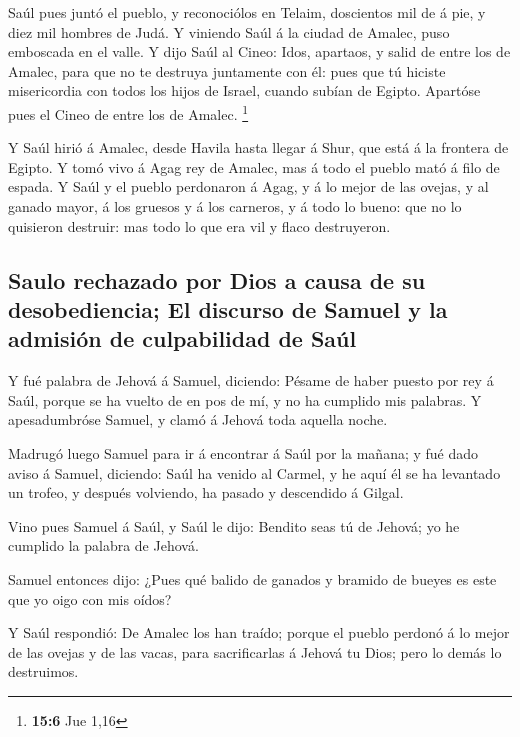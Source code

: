  Saúl pues juntó el pueblo, y reconociólos en Telaim,
doscientos mil de á pie, y diez mil hombres de Judá.  Y
viniendo Saúl á la ciudad de Amalec, puso emboscada en el valle.
 Y dijo Saúl al Cineo: Idos, apartaos, y salid de entre
los de Amalec, para que no te destruya juntamente con él: pues que tú
hiciste misericordia con todos los hijos de Israel, cuando subían de
Egipto. Apartóse pues el Cineo de entre los de Amalec. \footnote{\textbf{15:6}
  Jue 1,16}

 Y Saúl hirió á Amalec, desde Havila hasta llegar á Shur,
que está á la frontera de Egipto.  Y tomó vivo á Agag rey
de Amalec, mas á todo el pueblo mató á filo de espada.  Y
Saúl y el pueblo perdonaron á Agag, y á lo mejor de las ovejas, y al
ganado mayor, á los gruesos y á los carneros, y á todo lo bueno: que no
lo quisieron destruir: mas todo lo que era vil y flaco destruyeron.

\hypertarget{saulo-rechazado-por-dios-a-causa-de-su-desobediencia-el-discurso-de-samuel-y-la-admisiuxf3n-de-culpabilidad-de-sauxfal}{%
\subsection{Saulo rechazado por Dios a causa de su desobediencia; El
discurso de Samuel y la admisión de culpabilidad de
Saúl}\label{saulo-rechazado-por-dios-a-causa-de-su-desobediencia-el-discurso-de-samuel-y-la-admisiuxf3n-de-culpabilidad-de-sauxfal}}

 Y fué palabra de Jehová á Samuel, diciendo:
 Pésame de haber puesto por rey á Saúl, porque se ha
vuelto de en pos de mí, y no ha cumplido mis palabras. Y apesadumbróse
Samuel, y clamó á Jehová toda aquella noche.

 Madrugó luego Samuel para ir á encontrar á Saúl por la
mañana; y fué dado aviso á Samuel, diciendo: Saúl ha venido al Carmel, y
he aquí él se ha levantado un trofeo, y después volviendo, ha pasado y
descendido á Gilgal.

 Vino pues Samuel á Saúl, y Saúl le dijo: Bendito seas tú
de Jehová; yo he cumplido la palabra de Jehová.

 Samuel entonces dijo: ¿Pues qué balido de ganados y
bramido de bueyes es este que yo oigo con mis oídos?

 Y Saúl respondió: De Amalec los han traído; porque el
pueblo perdonó á lo mejor de las ovejas y de las vacas, para
sacrificarlas á Jehová tu Dios; pero lo demás lo destruimos.

